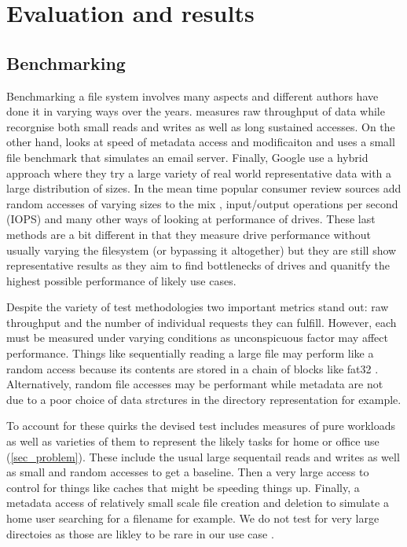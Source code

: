 \chapter{Evaluation and results}

    \section{Benchmarking}
        \label{sec_benchmark}

        Benchmarking a file system involves many aspects and different authors
        have done it in varying ways over the years. \citeauthor{FFS} measures
        raw throughput of data while \citeauthor{LFS} recorgnise both small
        reads and writes as well as long sustained accesses.  On the other
        hand, \citeauthor{soft_updates} looks at speed of metadata access and
        modificaiton and \citeauthor{ext4_space_maps} uses a small file
        benchmark that simulates an email server. Finally, Google use a hybrid
        approach where they try a large variety of real world representative
        data with a large distribution of sizes. In the mean time popular
        consumer review sources add random accesses of varying sizes to the mix
        \cite{servethehome_review}, input/output operations per second (IOPS)
        \cite{tomshardware_review} and many other ways of looking at
        performance of drives. These last methods are a bit different in that
        they measure drive performance without usually varying the filesystem
        (or bypassing it altogether) but they are still show representative
        results as they aim to find bottlenecks of drives and quanitfy the
        highest possible performance of likely use cases.

        Despite the variety of test methodologies two important metrics stand
        out: raw throughput and the number of individual requests they can
        fulfill. However, each must be measured under varying conditions as
        unconspicuous factor may affect performance. Things like sequentially
        reading a large file may perform like a random access because its
        contents are stored in a chain of blocks like fat32 \cite{fat32}.
        Alternatively, random file accesses may be performant while metadata
        are not due to a poor choice of data strctures in the directory
        representation for example.

        To account for these quirks the devised test includes measures of pure
        workloads as well as varieties of them to represent the likely tasks
        for home or office use (\ref{sec_problem}). These include the usual
        large sequentail reads and writes as well as small and random accesses
        to get a baseline. Then a very large access to control for things like
        caches that might be speeding things up. Finally, a metadata access of
        relatively small scale file creation and deletion to simulate a home
        user searching for a filename for example. We do not test for very
        large directoies as those are likley to be rare in our use case
        \cite{contents_study}.

